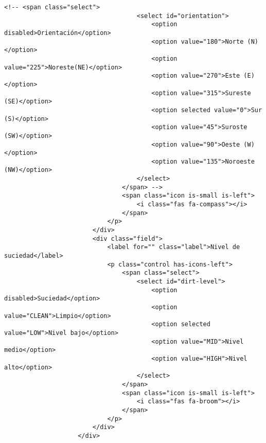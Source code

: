 \begin{lstlisting}[style=ES6, caption={public/index.html}]
                                <!-- <span class="select">
                                    <select id="orientation">
                                        <option disabled>Orientación</option>
                                        <option value="180">Norte (N)</option>
                                        <option value="225">Noreste(NE)</option>
                                        <option value="270">Este (E)</option>
                                        <option value="315">Sureste (SE)</option>
                                        <option selected value="0">Sur (S)</option>
                                        <option value="45">Suroste (SW)</option>
                                        <option value="90">Oeste (W)</option>
                                        <option value="135">Noroeste (NW)</option>
                                    </select>
                                </span> -->
                                <span class="icon is-small is-left">
                                    <i class="fas fa-compass"></i>
                                </span>
                            </p>
                        </div>
                        <div class="field">
                            <label for="" class="label">Nivel de suciedad</label>
                            <p class="control has-icons-left">
                                <span class="select">
                                    <select id="dirt-level">
                                        <option disabled>Suciedad</option>
                                        <option value="CLEAN">Limpio</option>
                                        <option selected value="LOW">Nivel bajo</option>
                                        <option value="MID">Nivel medio</option>
                                        <option value="HIGH">Nivel alto</option>
                                    </select>
                                </span>
                                <span class="icon is-small is-left">
                                    <i class="fas fa-broom"></i>
                                </span>
                            </p>
                        </div>
                    </div>


\end{lstlisting}
